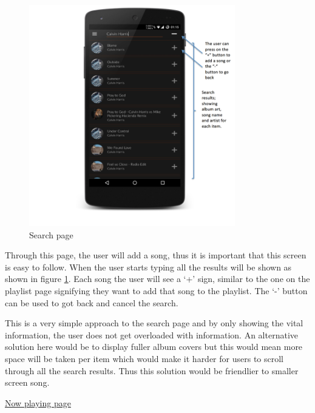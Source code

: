 \noindent
\begin{figure}[h!]
\centering
\includegraphics[width=0.8\textwidth]{./img/searchannotated.png}
\caption{Search page}
\label{fig:searchpage}
\end{figure}

Through this page, the user will add a song, thus it is important that this screen is easy to follow. When the user starts typing all the results will be shown as shown in figure \ref{fig:searchpage}. Each song the user will see a `+' sign, similar to the one on the playlist page signifying they want to add that song to the playlist. The `-' button can be used to got back and cancel the search. 

This is a very simple approach to the search page and by only showing the vital information, the user does not get overloaded with information. An alternative solution here would be to display fuller album covers but this would mean more space will be taken per item which would make it harder for users to scroll through all the search results. Thus this solution would be friendlier to smaller screen song.

\clearpage

\noindent\underline{Now playing page}\newline

